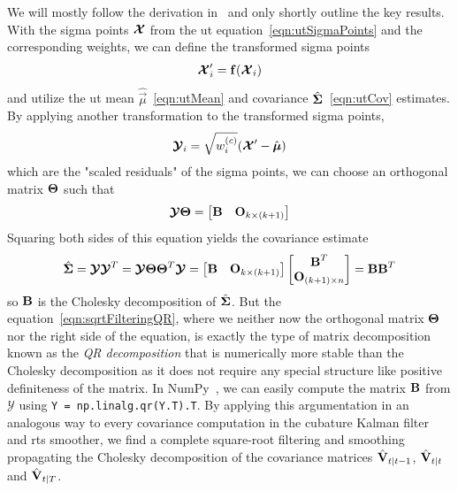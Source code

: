 		We will mostly follow the derivation in~\cite{ruttenSquarerootUnscentedFiltering2013} and only shortly outline the key results. With the sigma points \( \boldsymbol{\mathrm{\mathcal{X}}} \) from the \ac{ut} equation~\eqref{eqn:utSigmaPoints} and the corresponding weights, we can define the transformed sigma points
		\begin{equation*}
			\boldsymbol{\mathrm{\mathcal{X}}}_i' = \boldsymbol{\mathrm{f}}(\boldsymbol{\mathrm{\mathcal{X}}}_i)
		\end{equation*}
		and utilize the \ac{ut} mean \( \hat{\vec{\mu}} \)~\eqref{eqn:utMean} and covariance \( \hat{\boldsymbol{\mathrm{\Sigma}}} \)~\eqref{eqn:utCov} estimates. By applying another transformation to the transformed sigma points,
		\begin{equation*}
			\boldsymbol{\mathrm{\mathcal{Y}}}_i = \sqrt{w_i^{(c)}} (\boldsymbol{\mathrm{\mathcal{X}}}' - \hat{\boldsymbol{\mathrm{\mu}}})
		\end{equation*}
		which are the "scaled residuals" of the sigma points, we can choose an orthogonal matrix \( \boldsymbol{\mathrm{\Theta}} \) such that
		\begin{equation}
			\boldsymbol{\mathrm{\mathcal{Y}}} \boldsymbol{\mathrm{\Theta}} = \begin{bmatrix} \boldsymbol{\mathrm{B}} & \boldsymbol{\mathrm{O}}_{k \times (k + 1)} \end{bmatrix}  \label{eqn:sqrtFilteringQR}
		\end{equation}
		Squaring both sides of this equation yields the covariance estimate
		\begin{equation*}
			\hat{\boldsymbol{\mathrm{\Sigma}}} = \boldsymbol{\mathrm{\mathcal{Y}}} \boldsymbol{\mathrm{\mathcal{Y}}}^T = \boldsymbol{\mathrm{\mathcal{Y}}} \boldsymbol{\mathrm{\Theta}} \boldsymbol{\mathrm{\Theta}}^T \boldsymbol{\mathrm{\mathcal{Y}}} = \begin{bmatrix} \boldsymbol{\mathrm{B}} & \boldsymbol{\mathrm{O}}_{k \times (k + 1)} \end{bmatrix} \begin{bmatrix} \boldsymbol{\mathrm{B}}^T \\ \boldsymbol{\mathrm{O}}_{(k + 1) \times n} \end{bmatrix} = \boldsymbol{\mathrm{B}} \boldsymbol{\mathrm{B}}^T
		\end{equation*}
		so \( \boldsymbol{\mathrm{B}} \) is the Cholesky decomposition of \( \hat{\boldsymbol{\mathrm{\Sigma}}} \). But the equation~\eqref{eqn:sqrtFilteringQR}, where we neither now the orthogonal matrix \( \boldsymbol{\mathrm{\Theta}} \) nor the right side of the equation, is exactly the type of matrix decomposition known as the \emph{QR decomposition} that is numerically more stable than the Cholesky decomposition as it does not require any special structure like positive definiteness of the matrix. In NumPy~\cite{harrisArrayProgrammingNumPy2020}, we can easily compute the matrix \( \boldsymbol{\mathrm{B}} \) from \( \mathbb{\mathcal{Y}} \) using \lstinline|Y = np.linalg.qr(Y.T).T|. By applying this argumentation in an analogous way to every covariance computation in the cubature Kalman filter and \ac{rts} smoother, we find a complete square-root filtering and smoothing propagating the Cholesky decomposition of the covariance matrices \( \hat{\boldsymbol{\mathrm{V}}}_{t \vert t - 1} \), \( \hat{\boldsymbol{\mathrm{V}}}_{t \vert t} \) and \( \hat{\boldsymbol{\mathrm{V}}}_{t \vert T} \).

